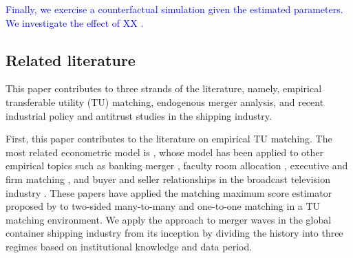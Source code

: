 \documentclass[10pt]{article}
\begin{document}
\textcolor{blue}{Finally, we exercise a counterfactual simulation given the estimated parameters. 
We investigate the effect of XX . }



\subsection{Related literature}

This paper contributes to three strands of the literature, namely, empirical transferable utility (TU) matching, endogenous merger analysis, and recent industrial policy and antitrust studies in the shipping industry.

First, this paper contributes to the literature on empirical TU matching. 
The most related econometric model is \cite{fox2018qe}, whose model has been applied to other empirical topics such as banking merger \citep{akkus2015ms,chen2013ijio}, faculty room allocation \citep{baccara2012aer}, executive and firm matching \citep{pan2017determinants}, and buyer and seller relationships in the broadcast television industry \citep{stahl2016aer}. 
These papers have applied the matching maximum score estimator proposed by \cite{fox2010qe,fox2018qe} to two-sided many-to-many and one-to-one matching in a TU matching environment. 
We apply the approach to merger waves in the global container shipping industry from its inception by dividing the history into three regimes based on institutional knowledge and data period.
\end{document}
